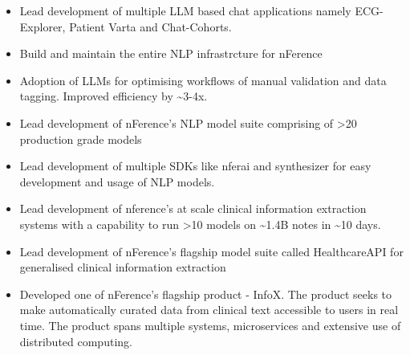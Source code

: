 \documentclass[10pt,a4paper,ragged2e,withhyper]{altacv}
\begin{document}
\begin{paracol}{2}


\begin{itemize}
\item Lead development of multiple LLM based chat applications namely ECG-Explorer, Patient Varta and Chat-Cohorts.
\item Build and maintain the entire NLP infrastrcture for nFerence
\item Adoption of LLMs for optimising workflows of manual validation and data tagging. Improved efficiency by \textasciitilde 3-4x.
\item Lead development of nFerence's NLP model suite comprising of >20 production grade models
\end{itemize}

\divider

\begin{itemize}
\item Lead development of multiple SDKs like nferai and synthesizer for easy development and usage of NLP models.
\item Lead development of nference's at scale clinical information extraction systems with a capability to run >10 models on \textasciitilde 1.4B notes in \textasciitilde 10 days.
\item Lead development of nFerence's flagship model suite called HealthcareAPI for generalised clinical information extraction
\end{itemize}

\divider

\begin{itemize}
  \item Developed one of nFerence’s flagship product - InfoX. The product seeks to make automatically curated data from clinical text accessible to users in real time. The product spans multiple systems, microservices and extensive use of distributed computing.
\end{itemize}

\divider



\end{paracol}
\end{document}
